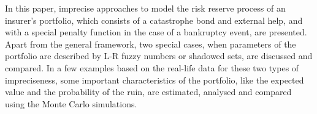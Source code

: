
In this paper, imprecise approaches to model the risk reserve process of an insurer's portfolio, which consists of a catastrophe bond and external help, and with a special penalty function in the case of a bankruptcy event, are presented.
Apart from the general framework, two special cases, when parameters of the portfolio are described by L-R fuzzy numbers or shadowed sets, are discussed and compared.
In a few examples based on the real-life data for these two types of impreciseness, some important characteristics of the portfolio, like the expected value and the probability of the ruin, are estimated, analysed and compared using the Monte Carlo simulations.  


